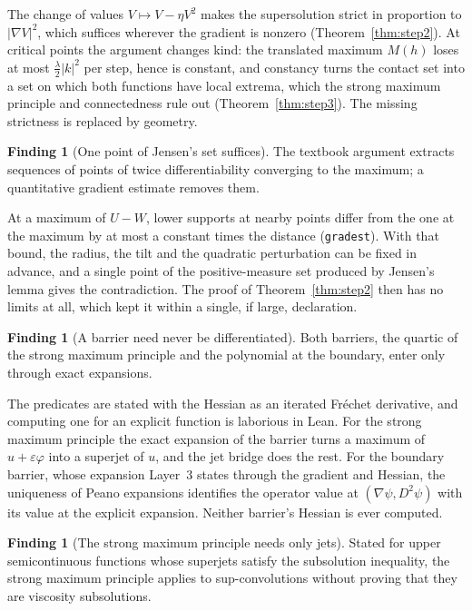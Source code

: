 \documentclass[11pt,reqno]{amsart}
\newcommand{\LEANREF}[1]{\texttt{\small\def\_{\textunderscore\allowbreak}#1}}
\newcommand{\eps}{\varepsilon}
\theoremstyle{plain}
\theoremstyle{definition}
\newtheorem{finding}[theorem]{Finding}
\begin{document}
The change of values $V \mapsto V - \eta V^2$ makes the supersolution strict in
proportion to $|\nabla V|^2$, which suffices wherever the gradient is nonzero
(Theorem~\ref{thm:step2}). At critical points the argument changes kind: the
translated maximum $M(h)$ loses at most $\tfrac\lambda2|k|^2$ per step, hence is
constant, and constancy turns the contact set into a set on which both functions
have local extrema, which the strong maximum principle and connectedness rule
out (Theorem~\ref{thm:step3}). The missing strictness is replaced by geometry.

\begin{finding}[One point of Jensen's set suffices]\label{find:onepoint}
The textbook argument extracts sequences of points of twice differentiability
converging to the maximum; a quantitative gradient estimate removes them.
\end{finding}

At a maximum of $U - W$, lower supports at nearby points differ from the one at
the maximum by at most a constant times the distance (\LEANREF{grad\_est}).
With that bound, the radius, the tilt and the quadratic perturbation can be
fixed in advance, and a single point of the positive-measure set produced by
Jensen's lemma gives the contradiction. The proof of Theorem~\ref{thm:step2}
then has no limits at all, which kept it within a single, if large, declaration.

\begin{finding}[A barrier need never be differentiated]\label{find:nodiff}
Both barriers, the quartic of the strong maximum principle and the polynomial at
the boundary, enter only through exact expansions.
\end{finding}

The predicates are stated with the Hessian as an iterated Fr\'echet derivative,
and computing one for an explicit function is laborious in Lean. For the strong
maximum principle the exact expansion of the barrier turns a maximum of
$u + \eps\varphi$ into a superjet of $u$, and the jet bridge does the rest. For
the boundary barrier, whose expansion Layer~3 states through the gradient and
Hessian, the uniqueness of Peano expansions identifies the operator value at
$(\nabla\psi, D^2\psi)$ with its value at the explicit expansion. Neither
barrier's Hessian is ever computed.

\begin{finding}[The strong maximum principle needs only jets]\label{find:smpjet}
Stated for upper semicontinuous functions whose superjets satisfy the
subsolution inequality, the strong maximum principle applies to
sup-convolutions without proving that they are viscosity subsolutions.
\end{finding}
\end{document}

